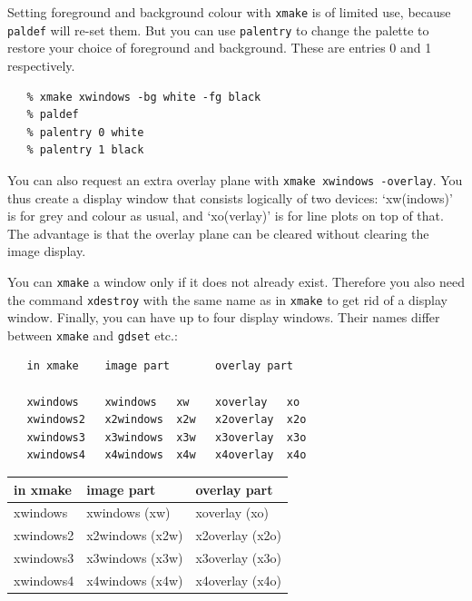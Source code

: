 \documentclass[11pt]{article}
\newenvironment{latexonly}{}{}
\newcommand{\xref}[3]{#1}
\begin{document}
   Setting foreground and background colour with {\tt xmake} is of
   limited use, because {\tt paldef} will re-set them. But you can use
{\tt \xref{palentry}{sun95}{PALENTRY}}
   to change the palette to restore your choice of foreground and
   background. These are entries 0 and 1 respectively.

\begin{verbatim}
   % xmake xwindows -bg white -fg black
   % paldef
   % palentry 0 white
   % palentry 1 black
\end{verbatim}

   You can also request an extra overlay plane with {\tt xmake xwindows
   -overlay}. You thus create a display window that consists
   logically of two devices: `xw(indows)' is for grey and colour as
   usual, and `xo(verlay)' is for line plots on top of that. The
   advantage is that the overlay plane can be cleared without clearing
   the image display.

   You can {\tt xmake} a window only if it does not already exist.
   Therefore you also need the command
{\tt \xref{xdestroy}{sun130}{xdestroyCommand}}
   with the same name as in {\tt xmake} to get rid of a display
   window. Finally, you can have up to four
   display windows. Their names differ between {\tt xmake} and
   {\tt gdset} etc.:

\begin{htmlonly}
\begin{verbatim}
   in xmake    image part       overlay part

   xwindows    xwindows   xw    xoverlay   xo
   xwindows2   x2windows  x2w   x2overlay  x2o
   xwindows3   x3windows  x3w   x3overlay  x3o
   xwindows4   x4windows  x4w   x4overlay  x4o
\end{verbatim}
\end{htmlonly}

\begin{latexonly}
\begin{center}
\begin{tabular}{|l|l|l|}
\hline\hline
   in xmake  & image part     & overlay part\\
\hline
   xwindows  & xwindows   (xw)  & xoverlay   (xo)\\
   xwindows2 & x2windows  (x2w) & x2overlay  (x2o)\\
   xwindows3 & x3windows  (x3w) & x3overlay  (x3o)\\
   xwindows4 & x4windows  (x4w) & x4overlay  (x4o)\\
\hline\hline
\end{tabular}
\end{center}
\end{latexonly}
\end{document}
